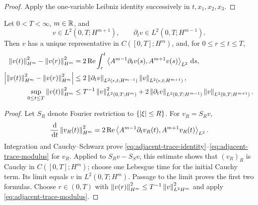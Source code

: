 \begin{proof}
Apply the one-variable Leibniz identity successively in \(t,x_1,x_2,x_3\).
\end{proof}

\begin{lemma}
\label{lem:adjacent-trace}
Let \(0<T<\infty\), \(m\in\mathbb R\), and
\[
 v\in L^2(0,T;H^{m+1}),
 \qquad
 \partial_tv\in L^2(0,T;H^{m-1}).
\]
Then \(v\) has a unique representative in \(C([0,T];H^m)\), and, for
\(0\le r\le t\le T\),
\begin{align}
 \left\lVert v(t)\right\rVert_{H^m}^2-\left\lVert v(r)\right\rVert_{H^m}^2
 &=2\operatorname{Re}\int_r^t
 \left\langle A^{m-1}\partial_tv(s),A^{m+1}v(s)\right\rangle_{L^2}\,\mathrm d s,
 \label{eq:adjacent-trace-identity}\\
 \left|\left\lVert v(t)\right\rVert_{H^m}^2-\left\lVert v(r)\right\rVert_{H^m}^2\right|
 &\le2\left\lVert \partial_tv\right\rVert_{L^2(r,t;H^{m-1})}
 \left\lVert v\right\rVert_{L^2(r,t;H^{m+1})},
 \label{eq:adjacent-trace-modulus}\\
 \sup_{0\le t\le T}\left\lVert v(t)\right\rVert_{H^m}^2
 &\le T^{-1}\left\lVert v\right\rVert_{L^2(0,T;H^m)}^2
 +2\left\lVert \partial_tv\right\rVert_{L^2(0,T;H^{m-1})}
 \left\lVert v\right\rVert_{L^2(0,T;H^{m+1})}.
 \label{eq:adjacent-trace-sup}
\end{align}
\end{lemma}

\begin{proof}
Let \(S_R\) denote Fourier restriction to \(\{\left|\xi\right|\le R\}\).  For
\(v_R=S_Rv\),
\[
 \frac{\,\mathrm d}{\,\mathrm d t}\left\lVert v_R(t)\right\rVert_{H^m}^2
 =2\operatorname{Re}\left\langle A^{m-1}\partial_tv_R(t),A^{m+1}v_R(t)\right\rangle_{L^2}.
\]
Integration and Cauchy--Schwarz prove
\eqref{eq:adjacent-trace-identity}--\eqref{eq:adjacent-trace-modulus} for
\(v_R\).  Applied to \(S_Rv-S_Sv\), this estimate shows that
\((v_R)_R\) is Cauchy in \(C([0,T];H^m)\); choose one Lebesgue time for the
initial Cauchy term.  Its limit equals \(v\) in
\(L^2(0,T;H^m)\).  Passage to the limit proves the first two formulas.
Choose \(r\in(0,T)\) with
\(\left\lVert v(r)\right\rVert_{H^m}^2\le T^{-1}\left\lVert v\right\rVert_{L^2H^m}^2\) and apply
\eqref{eq:adjacent-trace-modulus}.
\end{proof}

